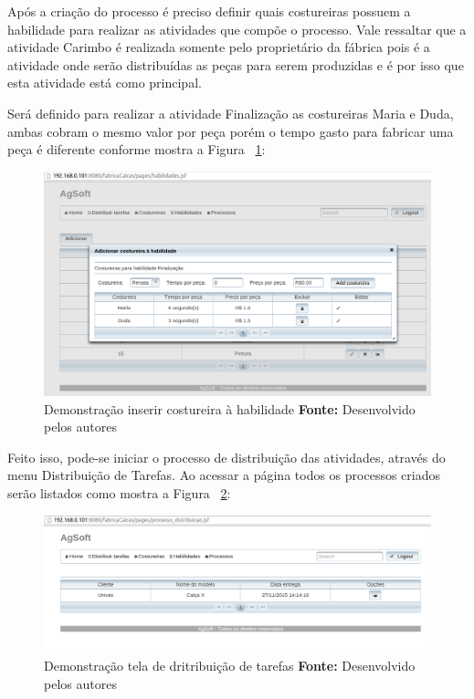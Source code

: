 \par Após a criação do processo é preciso definir quais costureiras possuem a
habilidade para realizar as atividades que compõe o processo. Vale ressaltar que
a atividade Carimbo é realizada somente pelo proprietário da fábrica pois é a
atividade onde serão distribuídas as peças para serem produzidas e é por isso
que esta atividade está como principal.

\par Será definido para realizar a atividade Finalização as costureiras
Maria e Duda, ambas cobram o mesmo valor por peça porém o tempo
gasto para fabricar uma peça é diferente conforme mostra
a Figura ~\ref{fig:costureira_habilidade}:

\newpage

\begin{figure}[h!]
	\centerline{\includegraphics[scale=0.4]{./imagens/tela_habilidade_teste1.png}}
	\caption[Demonstração inserir costureira à habilidade]
	{Demonstração inserir costureira à habilidade \textbf{Fonte:} Desenvolvido pelos autores}
	\label{fig:costureira_habilidade}
\end{figure}


\par Feito isso, pode-se iniciar o processo de distribuição
das atividades, através do menu Distribuição de Tarefas.
Ao acessar a página todos os processos criados serão
listados como mostra a Figura ~\ref{fig:distribuicao_tarefas}:

\begin{figure}[h!]
	\centerline{\includegraphics[scale=0.4]{./imagens/tela_distribuicao_tarefas.png}}
	\caption[Demonstração tela de dritribuição de tarefas]
	{Demonstração tela de dritribuição de tarefas \textbf{Fonte:} Desenvolvido pelos autores}
	\label{fig:distribuicao_tarefas}
\end{figure}


